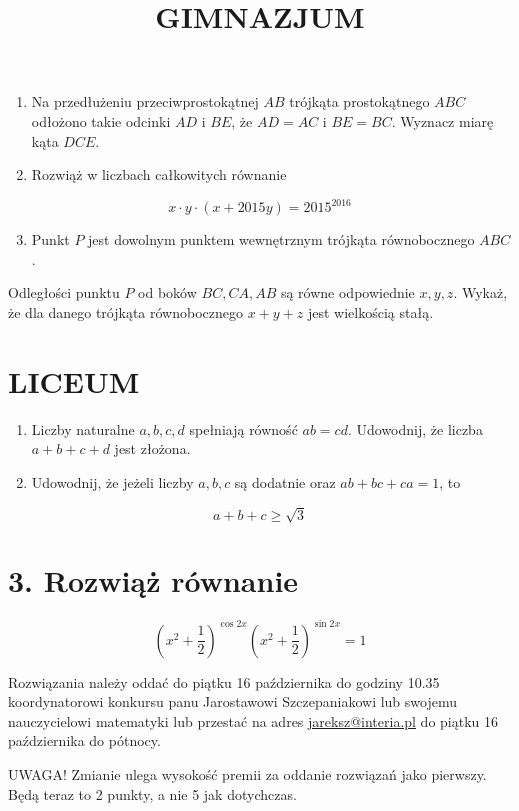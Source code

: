 \documentclass[10pt]{article}
\title{GIMNAZJUM }
\author{}
\date{}
\begin{document}
\maketitle
\begin{enumerate}
  \item Na przedłużeniu przeciwprostokątnej \(A B\) trójkąta prostokątnego \(A B C\) odłożono takie odcinki \(A D\) i \(B E\), że \(A D=A C\) i \(B E=B C\). Wyznacz miarę kąta \(D C E\).
  \item Rozwiąż w liczbach całkowitych równanie
\end{enumerate}

\[
x \cdot y \cdot(x+2015 y)=2015^{2016}
\]

\begin{enumerate}
  \setcounter{enumi}{2}
  \item Punkt \(P\) jest dowolnym punktem wewnętrznym trójkąta równobocznego \(A B C\).
\end{enumerate}

Odległości punktu \(P\) od boków \(B C, C A, A B\) są równe odpowiednie \(x, y, z\). Wykaż, że dla danego trójkąta równobocznego \(x+y+z\) jest wielkością stałą.

\section*{LICEUM}
\begin{enumerate}
  \item Liczby naturalne \(a, b, c, d\) spełniają równość \(a b=c d\). Udowodnij, że liczba \(a+b+c+d\) jest złożona.
  \item Udowodnij, że jeżeli liczby \(a, b, c\) są dodatnie oraz \(a b+b c+c a=1\), to
\end{enumerate}

\[
a+b+c \geq \sqrt{3}
\]

\section*{3. Rozwiąż równanie}
\[
\left(x^{2}+\frac{1}{2}\right)^{\cos 2 x}\left(x^{2}+\frac{1}{2}\right)^{\sin 2 x}=1
\]

Rozwiązania należy oddać do piątku 16 października do godziny 10.35 koordynatorowi konkursu panu Jarostawowi Szczepaniakowi lub swojemu nauczycielowi matematyki lub przestać na adres \href{mailto:jareksz@interia.pl}{jareksz@interia.pl} do piątku 16 października do pótnocy.

UWAGA! Zmianie ulega wysokość premii za oddanie rozwiązań jako pierwszy. Będą teraz to 2 punkty, a nie 5 jak dotychczas.
\end{document}
